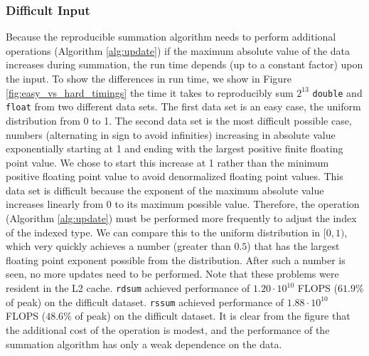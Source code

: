   \subsubsection{Difficult Input}
    Because the reproducible summation algorithm needs to perform additional
    operations (Algorithm \ref{alg:update}) if the maximum absolute value
    of the data increases during summation, the run time depends (up to a
    constant factor) upon the input. To show the differences in run time,
    we show in Figure \ref{fig:easy_vs_hard_timings} the time it takes to reproducibly sum $2^{13}$ \texttt{double}
    and \texttt{float} from two different data sets. The first data set is
    an easy case, the uniform distribution from 0 to 1. The second data set
    is the most difficult possible case, numbers (alternating in sign to
    avoid infinities) increasing in absolute value exponentially starting
    at 1 and ending with the
    largest positive finite floating point value. We chose to start this increase at 1 rather than the minimum positive floating point value to avoid denormalized floating point values. This data set is difficult
    because the exponent of the maximum absolute value increases linearly
    from 0 to its maximum possible value. Therefore, the
     operation (Algorithm \ref{alg:update}) must be
    performed more frequently to adjust the index of the indexed type. We
    can compare this to the uniform distribution in $[0, 1)$, which very
    quickly achieves a number (greater than $0.5$) that has the largest
    floating point exponent possible from the distribution. After such a
    number is seen, no more updates need to be performed. Note that these problems were resident in the L2 cache. \texttt{rdsum} achieved performance of $1.20\cdot 10^{10}$ FLOPS ($61.9\%$ of peak) on the difficult dataset. \texttt{rssum} achieved performance of $1.88\cdot 10^{10}$ FLOPS ($48.6\%$ of peak) on the difficult dataset. It is clear from the figure that the additional cost of the  operation is modest, and the performance of the summation algorithm has only a weak dependence on the data.
